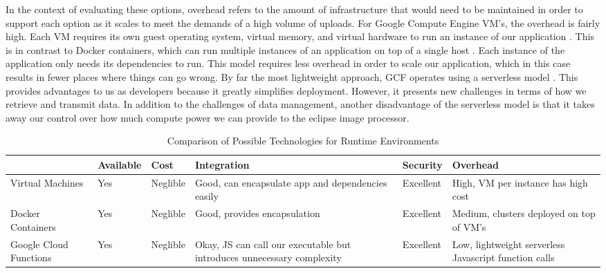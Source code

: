 \documentclass[10pt, onecolumn, draftclsnofoot, letterpaper, compsoc]{IEEEtran}
\begin{document}
In the context of evaluating these options, overhead refers to the amount of
infrastructure that would need to be maintained in order to support each option
as it scales to meet the demands of a high volume of uploads. For Google Compute
Engine VM’s, the overhead is fairly high. Each VM requires its own guest
operating system, virtual memory, and virtual hardware to run an instance of our
application \cite{docker, gcf}. This is in contrast to Docker containers, which
can run multiple instances of an application on top of a single host
\cite{docker}. Each instance of the application only needs its dependencies to
run. This model requires less overhead in order to scale our application, which
in this case results in fewer places where things can go wrong. By far the most
lightweight approach, GCF operates using a serverless model \cite{gcp}. This
provides advantages to us as developers because it greatly simplifies
deployment. However, it presents new challenges in terms of how we retrieve and
transmit data. In addition to the challenges of data management, another
disadvantage of the serverless model is that it takes away our control over how
much compute power we can provide to the eclipse image processor. \\

\begin{table}[h]
\centering
\caption{Comparison of Possible Technologies for Runtime Environments}
\begin{tabular}{|p{2.1cm}|p{2.1cm}|p{2.1cm}|p{2.1cm}|p{2.1cm}|p{2.1cm}|}
\cline{4-4}

\hline  & Available & Cost & Integration & Security & Overhead  \\ \hline

Virtual Machines  & Yes & Neglible & Good, can encapsulate app and dependencies easily &  Excellent & High, VM per instance has high cost  \\ \hline

Docker Containers  & Yes & Neglible & Good, provides encapsulation &  Excellent & Medium, clusters deployed on top of VM’s  \\ \hline

Google Cloud Functions  & Yes & Neglible & Okay, JS can call our executable but introduces unnecessary complexity & Excellent & Low, lightweight serverless Javascript function calls  \\ \hline

\end{tabular}
\label{table:george2}
\end{table}
\end{document}
